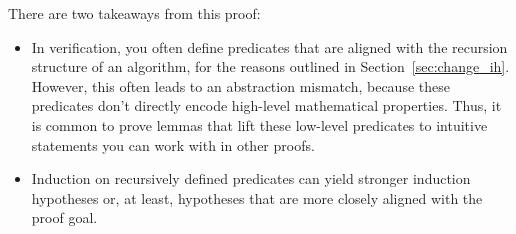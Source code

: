 \documentclass{article}
\begin{document}
There are two takeaways from this proof:
\begin{itemize}
  \item In verification, you often define predicates that are aligned with the recursion structure of an algorithm, for the reasons outlined in Section~\ref{sec:change_ih}.
  However, this often leads to an abstraction mismatch, because these predicates don't directly encode high-level mathematical properties.
  Thus, it is common to prove lemmas that lift these low-level predicates to intuitive statements you can work with in other proofs.
  \item Induction on recursively defined predicates can yield stronger induction hypotheses or, at least, hypotheses that are more closely aligned with the proof goal.
\end{itemize}



\end{document}
